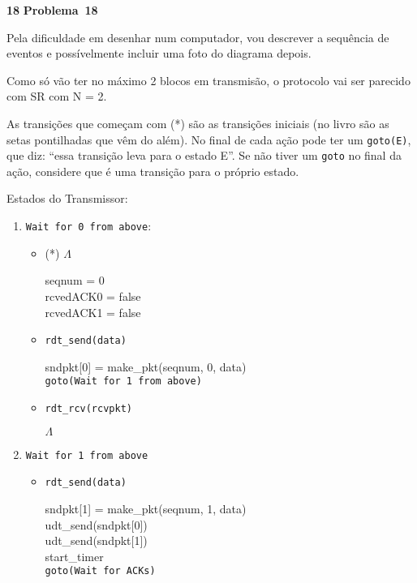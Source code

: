 \documentclass{article}
\newcounter{exe-list}
\newenvironment{exe}[2][Problema]
    {\newcommand{\opt}{(Opcional)}%
    \newcommand{\sketch}[1]{{\bfseries Rascunho:} ##1}%
    \medskip\par\noindent\ifthenelse{\equal{#1}{}}
        {\textbf{\large #2}}
        {\textbf{\large #1~#2}}%
    \medskip\par\noindent}
    {\medskip}
\begin{document}
\begin{exe}{18}
    Pela dificuldade em desenhar num computador,
    vou descrever a sequência de eventos e
    possívelmente incluir uma foto do diagrama depois.

    Como só vão ter no máximo 2 blocos em transmisão,
    o protocolo vai ser parecido com SR com N = 2.

    As transições que começam com (*) são as transições iniciais
    (no livro são as setas pontilhadas que vêm do além).
    No final de cada ação pode ter um \texttt{goto(E)},
    que diz: ``essa transição leva para o estado E''.
    Se não tiver um \texttt{goto} no final da ação,
    considere que é uma transição para o próprio estado.

    Estados do Transmissor:
    \begin{enumerate}
        \item \texttt{Wait for 0 from above}:
            \begin{itemize}
                \item (*) \(\Lambda\) \par
                    seqnum = 0 \\
                    rcvedACK0 = false \\
                    rcvedACK1 = false
                \item \texttt{rdt\_send(data)} \par
                    sndpkt[0]
                        = make\_pkt(seqnum, 0, data) \\
                    \texttt{goto(Wait for 1 from above)}
                \item \texttt{rdt\_rcv(rcvpkt)} \par
                    \(\Lambda\)
            \end{itemize}
        \item \texttt{Wait for 1 from above} \par
            \begin{itemize}
                \item \texttt{rdt\_send(data)} \par
                    sndpkt[1]
                        = make\_pkt(seqnum, 1, data) \\
                    udt\_send(sndpkt[0]) \\
                    udt\_send(sndpkt[1]) \\
                    start\_timer \\
                    \texttt{goto(Wait for ACKs)}

\end{itemize}
\end{enumerate}
\end{exe}
\end{document}

